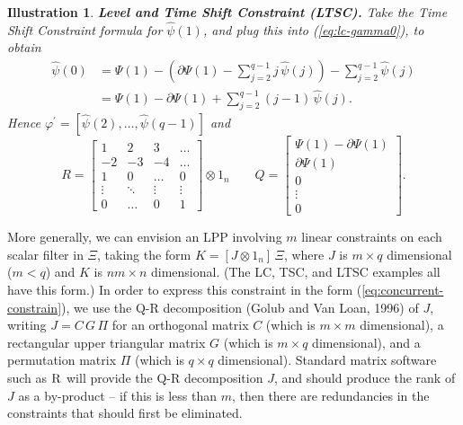 \documentclass[a4paper]{book}
\newtheorem{Illustration}{Illustration}
\begin{document}
 
\begin{Illustration}  {\bf Level and Time Shift Constraint (LTSC).}  \rm
\label{ill:ltsc}
   Take the Time Shift Constraint formula for $\widehat{\psi} (1)$,
 and plug this into (\ref{eq:lc-gamma0}), to obtain
\begin{align*}
 \widehat{\psi} (0)  & = \Psi (1) - \left( \partial {\Psi} (1)  
 -  \sum_{j=2}^{q-1} j  \, \widehat{\psi} (j) \right) -  \sum_{j=2}^{q-1} 
 \widehat{\psi} (j)  \\
	& = \Psi (1) -  \partial {\Psi} (1)  +  \sum_{j=2}^{q-1} (j-1)  \, \widehat{\psi} (j).
\end{align*}
 Hence  $ \varphi^{\prime}  = [  \widehat{\psi} (2), \ldots, \widehat{\psi} (q-1)  ] $ and
\[
	R  = \left[ \begin{array}{cccc} 1 & 2  &  3  &   \ldots    \\  -2  & -3  &  -4  & \ldots  \\
		 1  & 0 & \ldots & 0 \\ 
		\vdots & \ddots & \vdots & \vdots \\ 0 & \ldots & 0 & 1 \end{array} \right] 
		\otimes 1_n \qquad
	Q = \left[ \begin{array}{c} \Psi (1) - \partial {\Psi} (1)  \\ 
	\partial {\Psi} (1) \\ 0 \\ \vdots \\ 0 \end{array} \right].
\]
\end{Illustration}

 
  More generally, we can envision an LPP involving $m$ linear constraints
 on each scalar filter in $\Xi$, taking the form
 $   K = [ J \otimes 1_n ] \, \Xi$, where $J$ is $m \times q$ dimensional
 ($m < q$) and $K$ is $n m \times n$ dimensional.
 (The LC, TSC, and LTSC examples all have this form.) 
 In order to express this constraint in the form 
 (\ref{eq:concurrent-constrain}), we use the Q-R decomposition 
 (Golub and Van Loan, 1996) of $J$, writing
 $J = C \, G \, \Pi$ for an orthogonal matrix $C$ (which is $m \times m$ dimensional), 
 a rectangular upper triangular matrix $G$
 (which is $m \times q$ dimensional), and a permutation matrix 
 $\Pi$ (which is $q \times q$ dimensional).  
 Standard matrix software such as $\textsc{R}$ will provide the Q-R decomposition $J$,
 and should produce the rank of $J$ as  a by-product --
 if this is less than $m$, then there are redundancies in the 
 constraints that should first be eliminated. 
 
\end{document}
